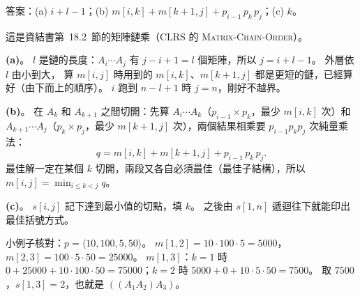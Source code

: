 \begin{pastsoln}
答案：(a) $i + l - 1$；(b) $m[i, k] + m[k+1, j] + p_{i-1}\,p_k\,p_j$；(c) $k$。

這是資結書第~18.2~節的矩陣鏈乘（CLRS 的 \textsc{Matrix-Chain-Order}）。

\textbf{(a)}。 $l$ 是鏈的長度：$A_i \cdots A_j$ 有 $j - i + 1 = l$ 個矩陣，所以 $j = i + l - 1$。 外層依 $l$ 由小到大，
算 $m[i, j]$ 時用到的 $m[i, k]$、$m[k+1, j]$ 都是更短的鏈，已經算好（由下而上的順序）。 $i$ 跑到 $n - l + 1$ 時
$j = n$，剛好不越界。

\textbf{(b)}。 在 $A_k$ 和 $A_{k+1}$ 之間切開：先算 $A_i \cdots A_k$（$p_{i-1} \times p_k$，最少 $m[i, k]$ 次）和
$A_{k+1} \cdots A_j$（$p_k \times p_j$，最少 $m[k+1, j]$ 次），兩個結果相乘要 $p_{i-1} p_k p_j$ 次純量乘法：
\[
q = m[i, k] + m[k + 1, j] + p_{i-1}\, p_k\, p_j.
\]
最佳解一定在某個 $k$ 切開，兩段又各自必須最佳（最佳子結構），所以
$m[i, j] = \min_{i \le k < j} q$。

\textbf{(c)}。 $s[i, j]$ 記下達到最小值的切點，填 $k$。 之後由 $s[1, n]$ 遞迴往下就能印出最佳括號方式。

小例子核對：$p = \langle 10, 100, 5, 50\rangle$。 $m[1,2] = 10 \cdot 100 \cdot 5 = 5000$，$m[2,3] = 100 \cdot 5 \cdot 50 = 25000$。
$m[1,3]$：$k = 1$ 時 $0 + 25000 + 10 \cdot 100 \cdot 50 = 75000$；$k = 2$ 時 $5000 + 0 + 10 \cdot 5 \cdot 50 = 7500$。
取 $7500$，$s[1, 3] = 2$，也就是 $((A_1A_2)A_3)$。
\end{pastsoln}
